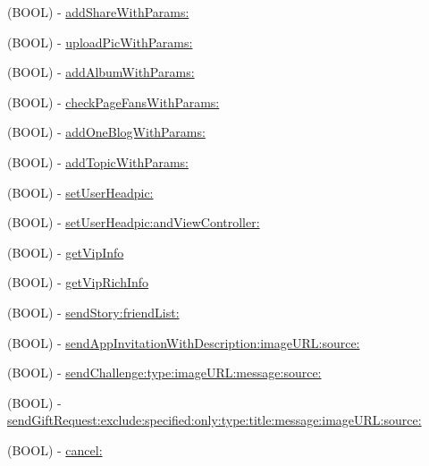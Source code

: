\begin{DoxyCompactItemize}
\item 
(B\+O\+OL) -\/ \mbox{\hyperlink{interface_tencent_o_auth_ab7f1ab3ecde38d8324456b306ebb3f7b}{add\+Share\+With\+Params\+:}}
\item 
(B\+O\+OL) -\/ \mbox{\hyperlink{interface_tencent_o_auth_a3345d746ba1bcdf4621a0fcc0a9f4237}{upload\+Pic\+With\+Params\+:}}
\item 
(B\+O\+OL) -\/ \mbox{\hyperlink{interface_tencent_o_auth_ade1376b852ac4968ad344b251edd129d}{add\+Album\+With\+Params\+:}}
\item 
(B\+O\+OL) -\/ \mbox{\hyperlink{interface_tencent_o_auth_aecd70d7b1b09dfce385f4b79f69450c3}{check\+Page\+Fans\+With\+Params\+:}}
\item 
(B\+O\+OL) -\/ \mbox{\hyperlink{interface_tencent_o_auth_a18bddf0cc13d3d6518bebbe9150457e0}{add\+One\+Blog\+With\+Params\+:}}
\item 
(B\+O\+OL) -\/ \mbox{\hyperlink{interface_tencent_o_auth_a501c96fc5ebf901a0faa3a83998f372d}{add\+Topic\+With\+Params\+:}}
\item 
(B\+O\+OL) -\/ \mbox{\hyperlink{interface_tencent_o_auth_a2efce592b134d225f092451cdfe7fd99}{set\+User\+Headpic\+:}}
\item 
(B\+O\+OL) -\/ \mbox{\hyperlink{interface_tencent_o_auth_afd9016fc8dbd669e309fb90f938436a3}{set\+User\+Headpic\+:and\+View\+Controller\+:}}
\item 
(B\+O\+OL) -\/ \mbox{\hyperlink{interface_tencent_o_auth_a0dca2b46ec141f5718f2fc8cecab251a}{get\+Vip\+Info}}
\item 
(B\+O\+OL) -\/ \mbox{\hyperlink{interface_tencent_o_auth_a6adee28cfff5d7f7cca6a648e1f2f638}{get\+Vip\+Rich\+Info}}
\item 
(B\+O\+OL) -\/ \mbox{\hyperlink{interface_tencent_o_auth_aa76ffb6e9da35a33210db470dc84f16d}{send\+Story\+:friend\+List\+:}}
\item 
(B\+O\+OL) -\/ \mbox{\hyperlink{interface_tencent_o_auth_aadda5cfd847a7fc39a573590f65d9184}{send\+App\+Invitation\+With\+Description\+:image\+U\+R\+L\+:source\+:}}
\item 
(B\+O\+OL) -\/ \mbox{\hyperlink{interface_tencent_o_auth_a9e34d42918cecd3b8b25343953d5ac6a}{send\+Challenge\+:type\+:image\+U\+R\+L\+:message\+:source\+:}}
\item 
(B\+O\+OL) -\/ \mbox{\hyperlink{interface_tencent_o_auth_a109d82c5c2ee0f4161dbbbe7ae0e3544}{send\+Gift\+Request\+:exclude\+:specified\+:only\+:type\+:title\+:message\+:image\+U\+R\+L\+:source\+:}}
\item 
(B\+O\+OL) -\/ \mbox{\hyperlink{interface_tencent_o_auth_a03709122ebf51c3b78bdd95bf07e505b}{cancel\+:}}

\end{DoxyCompactItemize}
